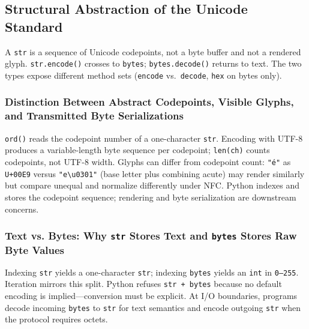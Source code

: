 \subsection{Structural Abstraction of the Unicode Standard}

A \texttt{str} is a sequence of Unicode codepoints, not a byte buffer and not a rendered glyph. \texttt{str.encode()} crosses to \texttt{bytes}; \texttt{bytes.decode()} returns to text. The two types expose different method sets (\texttt{encode} vs.\ \texttt{decode}, \texttt{hex} on bytes only).

\subsubsection{Distinction Between Abstract Codepoints, Visible Glyphs, and Transmitted Byte Serializations}

\texttt{ord()} reads the codepoint number of a one-character \texttt{str}. Encoding with UTF-8 produces a variable-length byte sequence per codepoint; \texttt{len(ch)} counts codepoints, not UTF-8 width. Glyphs can differ from codepoint count: \texttt{"é"} as \texttt{U+00E9} versus \texttt{"e\textbackslash u0301"} (base letter plus combining acute) may render similarly but compare unequal and normalize differently under NFC. Python indexes and stores the codepoint sequence; rendering and byte serialization are downstream concerns.

\subsubsection{Text vs. Bytes: Why \texttt{str} Stores Text and \texttt{bytes} Stores Raw Byte Values}

Indexing \texttt{str} yields a one-character \texttt{str}; indexing \texttt{bytes} yields an \texttt{int} in \texttt{0--255}. Iteration mirrors this split. Python refuses \texttt{str + bytes} because no default encoding is implied---conversion must be explicit. At I/O boundaries, programs decode incoming \texttt{bytes} to \texttt{str} for text semantics and encode outgoing \texttt{str} when the protocol requires octets.
